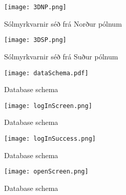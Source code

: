 \documentclass[12pt, git, final]{rureport}
\begin{document}
\begin{figure}
	\centering
	\texttt{[image: 3DNP.png]}
	\caption{Sólmyrkvarnir séð frá Norður pólnum}
	\label{fig:3DNP}
\end{figure}

\begin{figure}
	\centering
	\texttt{[image: 3DSP.png]}
	\caption{Sólmyrkvarnir séð frá Suður pólnum}
	\label{fig:3DSP}
\end{figure}

\begin{figure}
	\centering 
	\texttt{[image: dataSchema.pdf]}
	\caption{Database schema \label{fig:dataschema}}
\end{figure} 
%
\begin{figure}
	\centering 
	\texttt{[image: logInScreen.png]}
	\caption{Database schema \label{fig:logScreen}}
\end{figure} 

\begin{figure}
	\centering 
	\texttt{[image: logInSuccess.png]}
	\caption{Database schema \label{fig:logsucces}}
\end{figure} 

\begin{figure}[t]
	\centering 
	\texttt{[image: openScreen.png]}
	\caption{Database schema \label{fig:openScreen}}
\end{figure} 

\clearpage

\printbibliography
\end{document}
